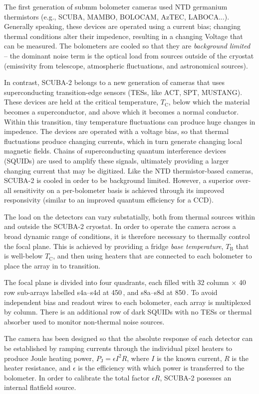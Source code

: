 \documentclass[useAMS,usenatbib,nofootinbib]{mn2e}
\begin{document}
The first generation of submm bolometer cameras used NTD germanium
thermistors (e.g., SCUBA, MAMBO, BOLOCAM, AzTEC, LABOCA...).
Generally speaking, these devices are operated using a current bias;
changing thermal conditions alter their impedence, resulting in a
changing Voltage that can be measured. The bolometers are cooled so
that they are {\em background limited} -- the dominant noise term is
the optical load from sources outside of the cryostat (emissivity from
telescope, atmospheric fluctuations, and astronomical sources).

In contrast, SCUBA-2 belongs to a new generation of cameras that uses
superconducting transition-edge sensors (TESs, like ACT, SPT,
MUSTANG). These devices are held at the critical temperature,
$T_\mathrm{C}$, below which the material becomes a superconductor, and
above which it becomes a normal conductor. Within this transition,
tiny temperature fluctuations can produce huge changes in
impedence. The devices are operated with a voltage bias, so that
thermal fluctuations produce changing currents, which in turn generate
changing local magnetic fields. Chains of superconducting quantum
interference devices (SQUIDs) are used to amplify these signals,
ultimately providing a larger changing current that may be
digitized. Like the NTD thermistor-based cameras, SCUBA-2 is cooled in
order to be background limited. However, a superior over-all
sensitivity on a per-bolometer basis is achieved through its improved
responsivity (similar to an improved quantum efficiency for a CCD).

The load on the detectors can vary substatially, both from thermal
sources within and outside the SCUBA-2 cryostat. In order to operate
the camera across a broad dynamic range of conditions, it is therefore
necessary to thermally control the focal plane. This is achieved by
providing a fridge {\em base temperature}, $T_\mathrm{B}$ that is
well-below $T_\mathrm{C}$, and then using heaters that are connected
to each bolometer to place the array in to transition.

The focal plane is divided into four quadrants, each filled with 32
column $\times$ 40 row sub-arrays labelled s4a--s4d at 450\,\micron,
and s8a--s8d at 850\,\micron. To avoid independent bias and readout
wires to each bolometer, each array is multiplexed by column. There is
an additional row of dark SQUIDs with no TESs or thermal absorber used
to monitor non-thermal noise sources.

The camera has been designed so that the absolute response of each
detector can be established by ramping currents through the individual
pixel heaters to produce Joule heating power, $P_\mathrm{J} =
\epsilon I^2R$, where $I$ is the known current, $R$ is the heater
resistance, and $\epsilon$ is the efficiency with which power is
transferred to the bolometer. In order to calibrate the total factor
$\epsilon R$, SCUBA-2 posesses an internal flatfield source.
\end{document}

